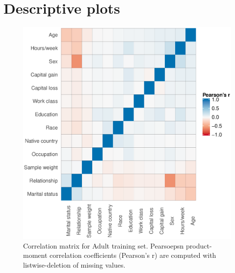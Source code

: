\documentclass[10pt]{book}
\theoremstyle{definition}
\begin{document}
\newpage
\lhead[\footnotesize\thepage\fancyplain{}\leftmark]{}\rhead[]{\fancyplain{}\rightmark\footnotesize\thepage}%
\section{Descriptive plots}

\begin{figure}[h!]
\includegraphics [scale=0.75, center]{figure/correlation-adult}\par
\caption{\footnotesize Correlation matrix for Adult training set. Pearsoepsn product-moment correlation coefficients (Pearson's r) are computed with listwise-deletion of missing values.}
 \label{fig:correlation-adult}
\end{figure}
\end{document}
